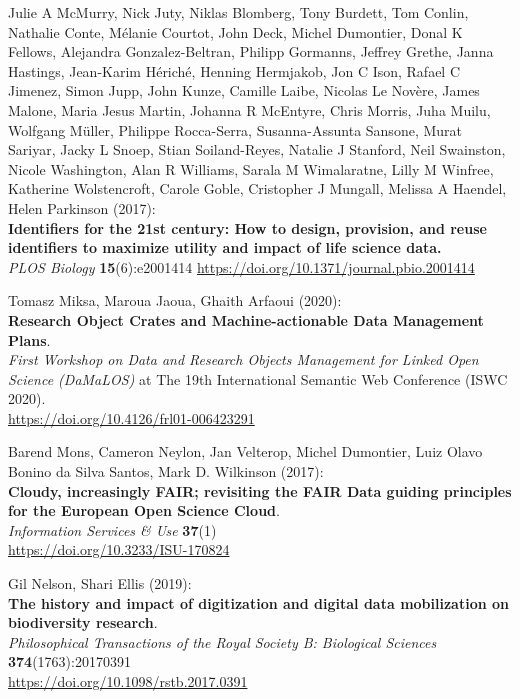 \begin{thebibliography}{9}
Julie A McMurry, Nick Juty, Niklas Blomberg, Tony
Burdett, Tom Conlin, Nathalie Conte, Mélanie Courtot, John Deck, Michel
Dumontier, Donal K Fellows, Alejandra Gonzalez-Beltran, Philipp
Gormanns, Jeffrey Grethe, Janna Hastings, Jean-Karim Hériché, Henning
Hermjakob, Jon C Ison, Rafael C Jimenez, Simon Jupp, John Kunze, Camille
Laibe, Nicolas Le Novère, James Malone, Maria Jesus Martin, Johanna R
McEntyre, Chris Morris, Juha Muilu, Wolfgang Müller, Philippe
Rocca-Serra, Susanna-Assunta Sansone, Murat Sariyar, Jacky L Snoep,
Stian Soiland-Reyes, Natalie J Stanford, Neil Swainston, Nicole
Washington, Alan R Williams, Sarala M Wimalaratne, Lilly M Winfree,
Katherine Wolstencroft, Carole Goble, Cristopher J Mungall, Melissa A
Haendel, Helen Parkinson (2017):\\
\textbf{Identifiers for the 21st century: How to design, provision, and
reuse identifiers to maximize utility and impact of life science
data.}\\
\emph{PLOS Biology} \textbf{15}(6):e2001414
\url{https://doi.org/10.1371/journal.pbio.2001414}

Tomasz Miksa, Maroua Jaoua, Ghaith Arfaoui (2020):\\
\textbf{Research Object Crates and Machine-actionable Data Management
Plans}.\\
\emph{First Workshop on Data and Research Objects Management for Linked
Open Science (DaMaLOS)} at The 19th International Semantic Web
Conference (ISWC 2020).\\
\url{https://doi.org/10.4126/frl01-006423291}

Barend Mons, Cameron Neylon, Jan Velterop, Michel
Dumontier, Luiz Olavo Bonino da Silva Santos, Mark D. Wilkinson
(2017):\\
\textbf{Cloudy, increasingly FAIR; revisiting the FAIR Data guiding
principles for the European Open Science Cloud}.\\
\emph{Information Services \& Use} \textbf{37}(1)\\
\url{https://doi.org/10.3233/ISU-170824}

Gil Nelson, Shari Ellis (2019):\\
\textbf{The history and impact of digitization and digital data mobilization on
biodiversity research}.\\
\emph{Philosophical Transactions of the Royal Society B: Biological Sciences}
\textbf{374}(1763):20170391\\
\url{https://doi.org/10.1098/rstb.2017.0391}


\end{thebibliography}

